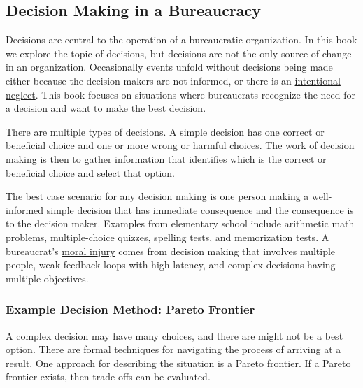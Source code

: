 \subsection*{Decision Making in a Bureaucracy\label{sec:decision-making}}

Decisions are central to the operation of a bureaucratic organization. In this book we explore the topic of decisions, but decisions are not the only source of change in an organization. Occasionally events unfold without decisions being made either because the decision makers are not informed, or there is an \href{https://en.wikipedia.org/wiki/Willful_blindness}{intentional neglect}. 
This book focuses on situations where bureaucrats recognize the need for a decision and want to make the best decision.

There are multiple types of decisions. 
A \gls{simple decision} 
has one correct or beneficial choice and one or more wrong or harmful choices. The work of decision making is then to gather information that identifies which is the correct or beneficial choice and select that option.

The best case scenario for any decision making is one person making a well-informed simple decision that has immediate consequence and the consequence is to the decision maker. Examples from elementary school include arithmetic math problems, multiple-choice quizzes, spelling tests, and memorization tests. A bureaucrat's \href{https://en.wikipedia.org/wiki/Moral_injury}{moral injury}
comes from decision making that involves multiple people, weak feedback loops with high latency, and complex decisions having multiple objectives.

\subsubsection{Example Decision Method: Pareto Frontier\label{sec:pareto}}

A complex decision may have many choices, and there are might not be a best option. There are formal techniques for navigating the process of arriving at a result. One approach for describing the situation is a \href{https://en.wikipedia.org/wiki/Pareto_front}{Pareto frontier}. 
If a Pareto frontier exists, then trade-offs can be evaluated. 

